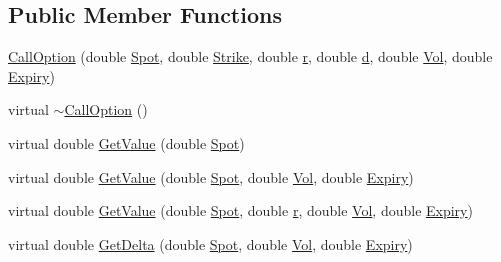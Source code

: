 \subsection*{Public Member Functions}
\begin{DoxyCompactItemize}
\item 
\hyperlink{classMyOption_1_1CallOption_acca66308420dd80fa525698a77fb53c4}{Call\+Option} (double \hyperlink{classMyOption_1_1Option_a6c6f01d75cde7e92d16a6d8d6f331a1d}{Spot}, double \hyperlink{classMyOption_1_1Option_a3033c483588ce26b175280c7f9dee8d1}{Strike}, double \hyperlink{classMyOption_1_1Option_aa8cb250427dece65ea49255d4102cc8d}{r}, double \hyperlink{classMyOption_1_1Option_a500979f4b32262594d895c4a83b58d1d}{d}, double \hyperlink{classMyOption_1_1Option_a5d6002c14b335c782873bf1437113513}{Vol}, double \hyperlink{classMyOption_1_1Option_ac1adacb417fede41d151b9cda05bcb3d}{Expiry})
\item 
virtual \hyperlink{classMyOption_1_1CallOption_a1b6b001899368335db393aa8050c9a5c}{$\sim$\+Call\+Option} ()
\item 
virtual double \hyperlink{classMyOption_1_1CallOption_a89cec28009a9c940504b13357842bb49}{Get\+Value} (double \hyperlink{classMyOption_1_1Option_a6c6f01d75cde7e92d16a6d8d6f331a1d}{Spot})
\item 
virtual double \hyperlink{classMyOption_1_1CallOption_a19f1aab1a885c9520c033fc27706777e}{Get\+Value} (double \hyperlink{classMyOption_1_1Option_a6c6f01d75cde7e92d16a6d8d6f331a1d}{Spot}, double \hyperlink{classMyOption_1_1Option_a5d6002c14b335c782873bf1437113513}{Vol}, double \hyperlink{classMyOption_1_1Option_ac1adacb417fede41d151b9cda05bcb3d}{Expiry})
\item 
virtual double \hyperlink{classMyOption_1_1CallOption_a2a3ca51422260a20ac9d151f38980df7}{Get\+Value} (double \hyperlink{classMyOption_1_1Option_a6c6f01d75cde7e92d16a6d8d6f331a1d}{Spot}, double \hyperlink{classMyOption_1_1Option_aa8cb250427dece65ea49255d4102cc8d}{r}, double \hyperlink{classMyOption_1_1Option_a5d6002c14b335c782873bf1437113513}{Vol}, double \hyperlink{classMyOption_1_1Option_ac1adacb417fede41d151b9cda05bcb3d}{Expiry})
\item 
virtual double \hyperlink{classMyOption_1_1CallOption_a46b6e6aa7b12967b825f50ec66911e51}{Get\+Delta} (double \hyperlink{classMyOption_1_1Option_a6c6f01d75cde7e92d16a6d8d6f331a1d}{Spot}, double \hyperlink{classMyOption_1_1Option_a5d6002c14b335c782873bf1437113513}{Vol}, double \hyperlink{classMyOption_1_1Option_ac1adacb417fede41d151b9cda05bcb3d}{Expiry})
\item 

\end{DoxyCompactItemize}
